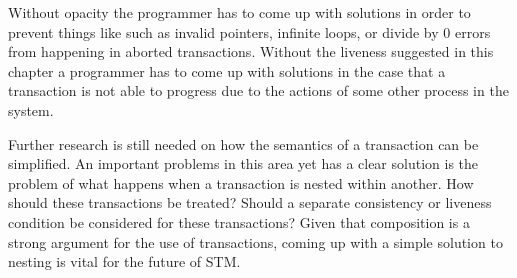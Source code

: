 Without opacity the programmer has to come up with solutions in order
to prevent things like such as invalid pointers, infinite loops, or divide by $0$ errors
from happening in aborted transactions.
Without the liveness suggested in this chapter a programmer has to come
up with solutions in the case that a transaction is not able to progress
due to the actions of some other process in the system.

Further research is still needed on how the semantics of a transaction
can be simplified.
An important problems in this area yet has a clear solution is the problem
of what happens when a transaction is nested within another.
How should these transactions be treated?
Should a separate consistency or liveness condition be considered for these transactions?
Given that composition is a strong argument for the use of transactions,
coming up with a simple solution to nesting is vital for the future of STM.
